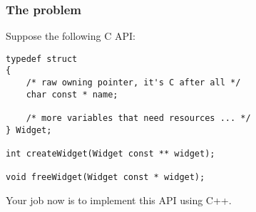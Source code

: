 \documentclass{beamer}
\begin{document}

\begin{frame}[fragile]
\frametitle{The problem}
Suppose the following C API:

\begin{lstlisting}
typedef struct
{
    /* raw owning pointer, it's C after all */
    char const * name;

    /* more variables that need resources ... */
} Widget;

int createWidget(Widget const ** widget);

void freeWidget(Widget const * widget);
\end{lstlisting}

Your job now is to implement this API using C++.
\end{frame}

\end{document}
